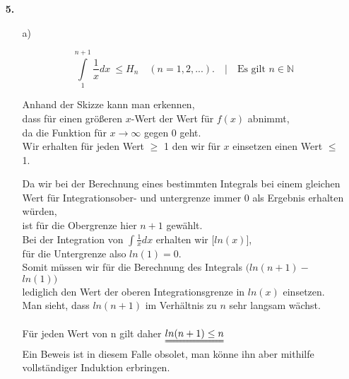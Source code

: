 \documentclass[a4paper,11pt]{article}
\begin{document}
\begin{enumerate}
        \item[\textbf{5.}]
            \begin{enumerate}

                \item[a)]

                    $$ \int\limits_{1}^{n+1}  \frac{1}{x} dx  \ \leq H_n \quad (n=1,2,...). \quad \Big| \quad \text{Es gilt }n \in \mathbb{N}$$




                Anhand der Skizze kann man erkennen,\\ dass für einen größeren $x$-Wert der Wert für $f(x)$ abnimmt, \\
                da die Funktion für  $x \rightarrow \infty$ gegen $0$ geht. \\
                Wir erhalten für jeden Wert $\geq$ 1 den wir für $x$ einsetzen einen Wert $\leq$ 1. 

                Da wir bei der Berechnung eines bestimmten Integrals bei einem gleichen Wert für Integrationsober- und untergrenze immer $0$ als Ergebnis erhalten würden, \\ ist für die Obergrenze hier $n+1$ gewählt. \\[0.3cm]
                Bei der Integration von $\int \frac{1}{x}dx$ erhalten wir $\Big[ln(x)\Big]$,\\ für die Untergrenze also $ln(1) = 0$. \\
                Somit müssen wir für die Berechnung des Integrals $ \Big(ln(n+1) -$ \sout{$ ln(1)$}$ \Big)$ \\ lediglich den Wert der oberen Integrationsgrenze in $ln(x)$ einsetzen. \\ 
                Man sieht, dass $ln(n+1)$ im Verhältnis zu $n$ sehr langsam wächst. \\ \\
                Für jeden Wert von n gilt daher $\uuline{ln(n+1) \leq n}$ \\
                Ein Beweis ist in diesem Falle obsolet, man könne ihn aber mithilfe vollständiger Induktion erbringen.



\end{enumerate}
\end{enumerate}
\end{document}
